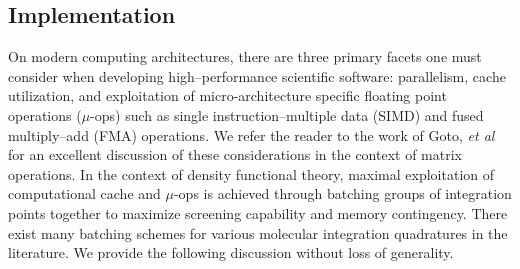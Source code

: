 \subsection{Implementation}
\label{sec:NCDFT_IMPL}

On modern computing architectures, there are three primary facets one must consider when developing high--performance
scientific software: parallelism, cache utilization, and exploitation of micro-architecture specific floating point
operations ($\mu$-ops) such as single instruction--multiple data (SIMD) and fused multiply--add (FMA) operations. 
We refer the reader to the work of Goto, \emph{et al}\cite{Goto08_TOMS12} for an excellent discussion of these considerations in the context of matrix operations.
In the context of density functional theory, maximal exploitation of computational cache
and $\mu$-ops is achieved through batching groups of integration points together to maximize screening capability and
memory contingency. 
There exist many batching schemes for various molecular integration quadratures in the 
literature\cite{Becke88_2547,Jackson90_7453,Laming93_997,Johnson95_169,Frisch96_213,Reveles04_681,Sierka11_3097}.
We provide the following discussion without loss of generality.


